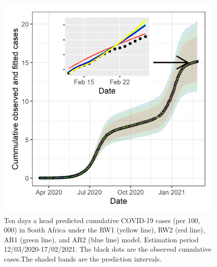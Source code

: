 \documentclass[10pt,letterpaper]{article}
\begin{document}
\begin{figure}[h]
\includegraphics[width=0.99\linewidth]{forcast_cum_all.png} \caption{Ten days a head predicted cumulative COVID-19 cases (per 100, 000) in South Africa under the RW1 (yellow line), RW2 (red line), AR1 (green line), and AR2 (blue line) model. Estimation period 12/03/2020-17/02/2021. The black dots are the observed cumulative cases.The shaded bands are the prediction intervals. }\label{fig:10daypred}
\end{figure}
\end{document}
